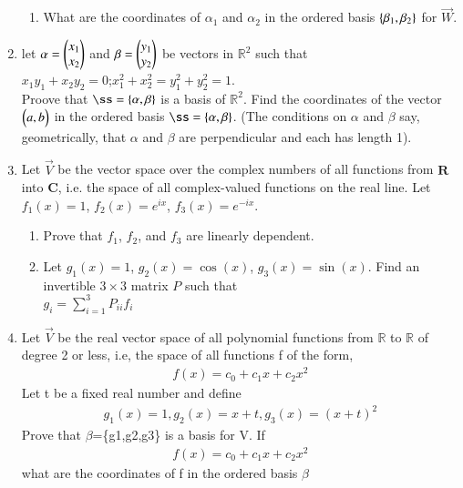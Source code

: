 \begin{enumerate}[label=\thesubsection.\arabic*.,ref=\thesubsection.\theenumi]
\begin{enumerate}[label=\emph{\alph*)}]
	\item What are the coordinates of $\alpha_1$ and $\alpha_2$ in the
		ordered basis $\left\{\beta_1, \beta_2\right\} $ for $\vec{W}$.
\end{enumerate}
\solution

%
\item let $\alpha=\begin{pmatrix}x_1\\x_2\end{pmatrix}$ and $\beta=\begin{pmatrix}y_1\\y_2\end{pmatrix}$ be vectors in $\mathbb{R}^2$ such that\\
$x_1y_1+x_2y_2=0$;\quad $x_1^2+x_2^2=y_1^2+y_2^2=1$.\\
Proove that $\ss=\{\vec{\alpha},\vec{\beta}\}$ is a basis of $\mathbb{R}^2$. Find the coordinates of the vector $\begin{pmatrix}a,b\end{pmatrix}$ in the ordered basis $\ss=\{\vec{\alpha},\vec{\beta}\}$. (The conditions on $\alpha$ and $\beta$ say, geometrically, that $\alpha$ and $\beta$ are perpendicular and each has length 1).
%
\\
\solution

%
\item 	Let $\vec{V}$ be the vector space over the complex numbers of all functions from $\mathbf{R}$ into $\mathbf{C}$, i.e. the space of all complex-valued functions on the real line. Let $f_1(x) = 1$, $f_2(x) = e^{ix}$, $f_3(x) = e^{-ix}$.\\
	\begin{enumerate}[label=(\alph*)]
		\item Prove that $f_1$, $f_2$, and $f_3$ are linearly dependent.\\
		\item Let $g_1(x) = 1$, $g_2(x) = \cos(x)$, $g_3(x) = \sin(x)$. Find an invertible $3\times 3$ matrix $P$ such that\\
		$g_i = \sum_{i=1}^{3} P_{ii}f_i$
	\end{enumerate}
%	
%
\solution

%
\item    Let $\vec{V}$ be the real vector space of all polynomial functions from $\mathbb{R}$ to $\mathbb{R}$ of degree 2 or less, i.e, the space of all functions f of the form,
   \begin{align*}
   f(x)=c_0+c_1x+c_2x^2
   \end{align*} 
   Let t be a fixed real number and define
   \begin{align*}
   g_1(x)=1,        g_2(x)=x+t,         g_3(x)=(x+t)^2
   \end{align*}
   Prove that $\beta$=\{g1,g2,g3\} is a basis for V. If 
   \begin{align*}
   f(x)=c_0+c_1x+c_2x^2
   \end{align*}
   what are the coordinates of f in the ordered basis $\beta$
%
\\
\solution

\end{enumerate}
